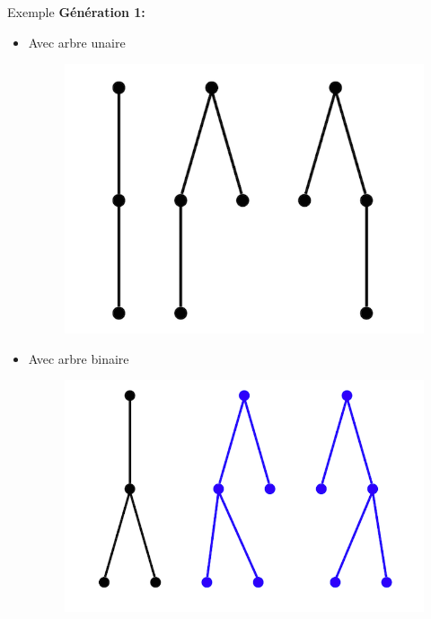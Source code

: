\documentclass{beamer}
\begin{document}
\begin{frame}{Exemple}
\textbf{Génération 1:}\\
\begin{itemize}
\item  Avec arbre unaire
\begin{figure}[h]
  \centering
  \includegraphics[scale=0.17]{gen1-1.png}
\end{figure}
\item Avec arbre binaire
\begin{figure}[h]
  \centering
  \includegraphics[scale=0.17]{gen1-2.png}
\end{figure}
\end{itemize}
\end{frame}
\end{document}
